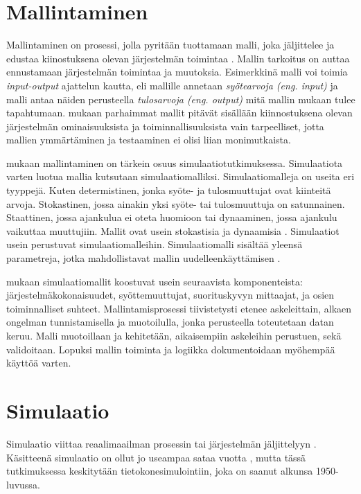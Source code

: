 \documentclass[utf8]{gradu3}
\begin{document}
\section{Mallintaminen} \label{mallintaminen}
Mallintaminen on prosessi, jolla pyritään tuottamaan malli, joka jäljittelee 
ja edustaa kiinostuksena olevan järjestelmän toimintaa \parencite{maria1997introduction}. 
Mallin tarkoitus on auttaa ennustamaan järjestelmän toimintaa ja muutoksia.
Esimerkkinä malli voi toimia \textit{input-output} ajattelun kautta, 
eli mallille annetaan \textit{syötearvoja (eng. input)} ja malli antaa näiden perusteella
\textit{tulosarvoja (eng. output)} mitä mallin mukaan tulee tapahtumaan.
\textcite{maria1997introduction} mukaan parhaimmat mallit pitävät 
sisällään kiinnostuksena olevan järjestelmän 
ominaisuuksista ja toiminnallisuuksista vain tarpeelliset, 
jotta mallien ymmärtäminen ja testaaminen ei olisi liian monimutkaista.

\textcite{maria1997introduction} mukaan mallintaminen on tärkein osuus simulaatiotutkimuksessa.
Simulaatiota varten luotua mallia kutsutaan simulaatiomalliksi.
Simulaatiomalleja on useita eri tyyppejä. 
Kuten determistinen, jonka syöte- ja tulosmuuttujat ovat kiinteitä arvoja. 
Stokastinen, jossa ainakin yksi syöte- tai tulosmuuttuja on satunnainen. 
Staattinen, jossa ajankulua ei oteta huomioon tai dynaaminen, 
jossa ajankulu vaikuttaa muuttujiin. Mallit ovat usein stokastisia ja dynaamisia \parencite{maria1997introduction}. 
Simulaatiot usein perustuvat simulaatiomalleihin. Simulaatiomalli sisältää yleensä parametreja,
jotka mahdollistavat mallin uudelleenkäyttämisen \parencite{introduction2005simulation}. 

\textcite{maria1997introduction} mukaan simulaatiomallit koostuvat usein seuraavista komponenteista: järjestelmäkokonaisuudet, syöttemuuttujat, suorituskyvyn mittaajat,
ja osien toiminnalliset suhteet. Mallintamisprosessi tiivistetysti etenee askeleittain, alkaen ongelman tunnistamisella ja muotoilulla, 
jonka perusteella toteutetaan datan keruu. Malli muotoillaan ja kehitetään, 
aikaisempiin askeleihin perustuen, sekä validoitaan. Lopuksi mallin toiminta ja logiikka dokumentoidaan myöhempää käyttöä varten.

\section{Simulaatio} \label{simulaatio}
Simulaatio viittaa reaalimaailman prosessin tai 
järjestelmän jäljittelyyn \parencite{banks1999introduction}. 
Käsitteenä simulaatio on ollut jo useampaa sataa vuotta 
\parencite{HistoryOfSimulation}, 
mutta tässä tutkimuksessa keskitytään tietokonesimulointiin, 
joka on saanut alkunsa 1950-luvussa. 
%
\parencites%
    {HistoryOfSimulation}%
    {historyOfSimulation1996}
\relax
%
\end{document}
